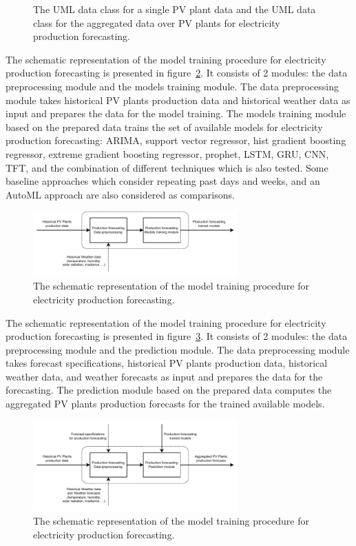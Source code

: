 \begin{figure}[H]
\begin{minipage}[b]{8.5cm}
\subcaption{}
\label{fig:umlproduction}
\end{minipage}
\caption{ The UML data class for a single PV plant data and  the UML data class for the aggregated data over PV plants for electricity production forecasting.}
\end{figure}

The schematic representation of the model training procedure for electricity production forecasting is presented in figure~\ref{fig:modeltrainingproduction}.
It consists of 2 modules: the data preprocessing module and the models training module.
The data preprocessing module takes historical PV plants production data and historical weather data as input and prepares the data for the model training.
The models training module based on the prepared data trains the set of available models for electricity production forecasting: ARIMA, support vector regressor, hist gradient boosting regressor, extreme gradient boosting regressor, prophet, LSTM, GRU, CNN, TFT, and the combination of different techniques which is also tested.
Some baseline approaches which consider repeating past days and weeks, and an AutoML approach are also considered as comparisons.

\begin{figure}[H]
\centering
\includegraphics[width=0.7\textwidth]{images/system_model_training_production}
\caption{The schematic representation of the model training procedure for electricity production forecasting.}
\label{fig:modeltrainingproduction}
\end{figure}

The schematic representation of the model training procedure for electricity production forecasting is presented in figure~\ref{fig:modelforecastingproduction}.
It consists of 2 modules: the data preprocessing module and the prediction module.
The data preprocessing module takes forecast specifications, historical PV plants production data, historical weather data, and weather forecasts as input and prepares the data for the forecasting.
The prediction module based on the prepared data computes the aggregated PV plants production forecasts for the trained available models.

\begin{figure}[H]
\centering
\includegraphics[width=0.7\textwidth]{images/system_model_forecasting_production}
\caption{The schematic representation of the model training procedure for electricity production forecasting.}
\label{fig:modelforecastingproduction}
\end{figure}
